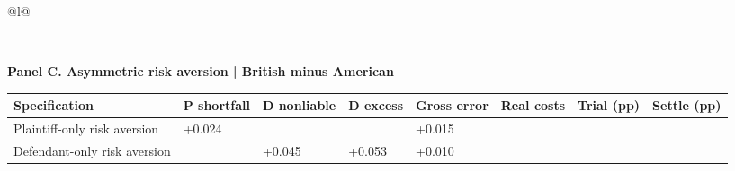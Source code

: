 \documentclass[10pt,border=5pt]{standalone}
\begin{document}
\begin{tabular}{@{}l@{}}
\begin{minipage}{18.400cm}
\end{minipage}
\\[12pt]
\noalign{\vskip 4pt}
\begin{minipage}{18.400cm}
\small
\setlength{\tabcolsep}{3pt}
\renewcommand{\arraystretch}{1.25}
\noindent\textbf{Panel C. Asymmetric risk aversion | British minus American}\par\smallskip
\begin{tabular}{@{}>{\raggedright\arraybackslash}p{5.454cm}>{\centering\arraybackslash}p{1.632cm}>{\centering\arraybackslash}p{1.632cm}>{\centering\arraybackslash}p{1.567cm}>{\centering\arraybackslash}p{1.567cm}>{\centering\arraybackslash}p{1.567cm}>{\centering\arraybackslash}p{1.610cm}>{\centering\arraybackslash}p{1.610cm}@{}}
\toprule
\textbf{Specification} & \textbf{P shortfall} & \textbf{D nonliable} & \textbf{D excess} & \textbf{Gross error} & \textbf{Real costs} & \textbf{Trial (pp)} & \textbf{Settle (pp)}\\\midrule
Plaintiff-only risk aversion & +0.024 & -0.063 & -0.003 & +0.015 & -0.095 & -16.8 & -1.2\\
Defendant-only risk aversion & -0.104 & +0.045 & +0.053 & +0.010 & -0.057 & -13.8 & -3.2\\
\bottomrule\end{tabular}
\end{minipage}
\end{tabular}
\end{document}

